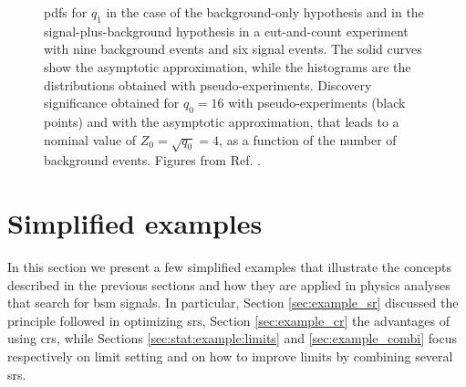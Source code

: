 \begin{figure}[h]
\centering 
{}
\caption{
 \glspl{pdf} for $q_1$ in the case of the background-only hypothesis and in the signal-plus-background hypothesis
in a cut-and-count experiment with nine background events and six signal events.
The solid curves show the asymptotic approximation, while the histograms are the distributions obtained with pseudo-experiments. 
 Discovery significance obtained for $q_0=16$ with pseudo-experiments (black points) and with the asymptotic approximation, that leads to a nominal value of $Z_0 = \sqrt{q_0} =4$, as a function of the number of background events. 
Figures from Ref. \cite{Cowan2011}.
}
\label{fig:stat:interp}
\end{figure}



\section{Simplified examples}
\label{sec:stat:examples}

In this section we present a few simplified examples that illustrate the concepts described in the previous sections and how they are applied in physics analyses that search for \gls{bsm} signals.
In particular, Section \ref{sec:example_sr} discussed the principle followed in optimizing \glspl{sr}, Section \ref{sec:example_cr} the advantages of using \glspl{cr},
while Sections \ref{sec:stat:example:limits} and \ref{sec:example_combi} focus respectively on limit setting and on how to improve limits by combining several \glspl{sr}.

